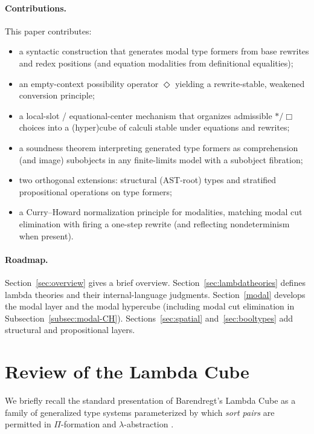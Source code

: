 \documentclass[11pt]{article}
\theoremstyle{definition}
\theoremstyle{plain}
\theoremstyle{remark}
\theoremstyle{plain}
\newcommand{\Boxsort}{\Box}
\newcommand{\astsort}{\ast}
\begin{document}
\paragraph{Contributions.}
This paper contributes:
\begin{itemize}[leftmargin=2em]
  \item a syntactic construction that generates modal type formers from base rewrites and redex positions (and equation modalities from definitional equalities);
  \item an empty-context possibility operator $\Diamond$ yielding a rewrite-stable, weakened conversion principle;
  \item a local-slot / equational-center mechanism that organizes admissible $\astsort/\Boxsort$ choices into a (hyper)cube of calculi stable under equations and rewrites;
  \item a soundness theorem interpreting generated type formers as comprehension (and image) subobjects in any finite-limits model with a subobject fibration;
  \item two orthogonal extensions: structural (AST-root) types and stratified propositional operations on type formers;
  \item a Curry–Howard normalization principle for modalities, matching modal cut elimination with firing a one-step rewrite (and reflecting nondeterminism when present).
\end{itemize}

\paragraph{Roadmap.}
Section~\ref{sec:overview} gives a brief overview.
Section~\ref{sec:lambdatheories} defines lambda theories and their internal-language judgments.
Section~\ref{modal} develops the modal layer and the modal hypercube (including modal cut elimination in Subsection~\ref{subsec:modal-CH}).
Sections~\ref{sec:spatial} and~\ref{sec:booltypes} add structural and propositional layers.

\section{Review of the Lambda Cube}
\label{sec:lambda-cube}

We briefly recall the standard presentation of Barendregt's Lambda Cube as a family of
generalized type systems parameterized by which \emph{sort pairs} are permitted in
$\Pi$-formation and $\lambda$-abstraction \cite{Barendregt1991}.
\end{document}
